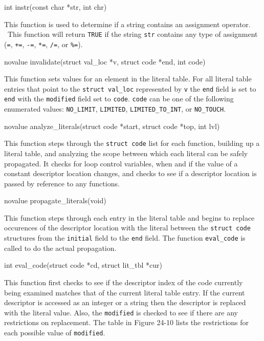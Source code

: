 {\ttfamily\mdseries
int instr(const char *str, int chr)}


This function is used to determine if a string contains an assignment
operator. \ This function will return \texttt{TRUE} if the string
\texttt{str} contains any type of assignment (\texttt{=}, \texttt{+=},
\texttt{{}-=}, \texttt{*=}, \texttt{/=}, or \texttt{\%=}).

{\ttfamily\mdseries
novalue invalidate(struct val\_loc *v, struct code *end, int code)}


This function sets values for an element in the literal table. For all
literal table entries that point to the \texttt{struct val\_loc}
represented by \texttt{v} the \texttt{end} field is set to
\texttt{end} with the \texttt{modified} field set to
\texttt{code}. \texttt{code} can be one of the following enumerated
values: \texttt{NO\_LIMIT}, \texttt{LIMITED},
\texttt{LIMITED\_TO\_INT}, or \texttt{NO\_TOUCH}.

{\ttfamily\mdseries
novalue analyze\_literals(struct code *start, struct code *top, int lvl)}


This function steps through the \texttt{struct code} list for each
function, building up a literal table, and analyzing the scope between
which each literal can be safely propagated. It checks for loop
control variables, when and if the value of a constant descriptor
location changes, and checks to see if a descriptor location is passed
by reference to any functions.

{\ttfamily\mdseries
novalue propagate\_literals(void)}


This function steps through each entry in the literal table and begins
to replace occurences of the descriptor location with the literal
between the \texttt{struct code} structures from the \texttt{initial}
field to the \texttt{end} field.  The function \texttt{eval\_code} is
called to do the actual propagation.

{\ttfamily\mdseries
int eval\_code(struct code *cd, struct lit\_tbl *cur)}


This function first checks to see if the descriptor index of the code
currently being examined matches that of the current literal table
entry. If the current descriptor is accessed as an integer or a string
then the descriptor is replaced with the literal value. Also, the
\texttt{modified} is checked to see if there are any restrictions on
replacement. The table in Figure 24-10 lists the restrictions for
each possible value of \texttt{modified}.

